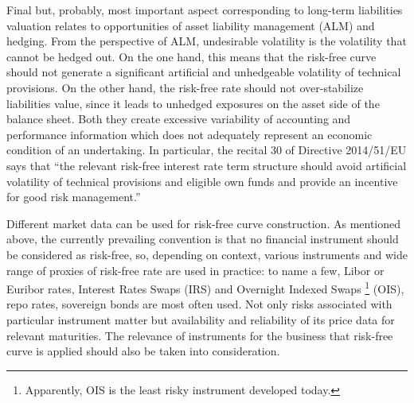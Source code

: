 
	Final but, probably, most important aspect corresponding to long-term liabilities valuation relates to opportunities of asset liability management (ALM) and hedging. 
	From the perspective of ALM, undesirable volatility is the volatility that cannot be hedged out. 
	On the one hand, this means that the risk-free curve should not generate a significant artificial and unhedgeable volatility of technical provisions. 
	On the other hand, the risk-free rate should not over-stabilize liabilities value, since it leads to unhedged exposures on the asset side of the balance sheet.  
	Both they create excessive variability of accounting and performance information which does not adequately represent an economic condition of an undertaking. 
	In particular, the recital 30 of Directive 2014/51/EU says that ``the relevant risk-free interest rate term structure should avoid artificial volatility of technical provisions and eligible own funds and provide an incentive for good risk management.''

	Different market data can be used for risk-free curve construction. 
	As mentioned above, the currently prevailing convention is that no financial instrument should be considered as risk-free, so, depending on context, various instruments and wide range of proxies of risk-free rate are used in practice: to name a few, Libor or Euribor rates, Interest Rates Swaps (IRS) and Overnight Indexed Swaps \footnote
{
 Apparently, OIS is the least risky instrument developed today.
}
(OIS),  repo rates, sovereign bonds are most often used. 
	Not only risks associated with particular instrument matter but availability and reliability of its price data for relevant maturities. 
	The relevance of instruments for the business that risk-free curve is applied should also be taken into consideration.
	
